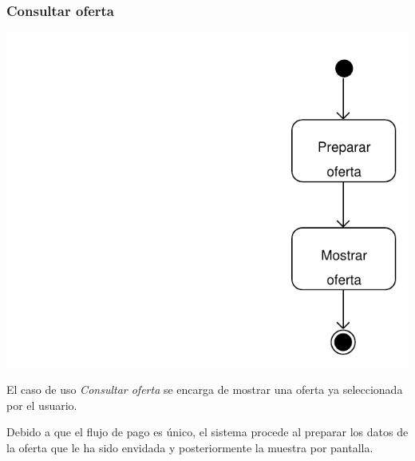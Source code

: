 \documentclass[11pt, a4paper, twoside, titlepage]{article}
\begin{document}
			\subsubsection{Consultar oferta}
				\begin{center}
					\includegraphics[scale=.7]{analisis/diagramas/da_consultaroferta.pdf}
				\end{center}
				El caso de uso {\itshape Consultar oferta} se encarga de mostrar una oferta ya seleccionada por el usuario. 
				
				Debido a que el flujo de pago es único, el sistema procede al preparar los datos de la oferta que le ha sido envidada y posteriormente la muestra por pantalla.
\end{document}
